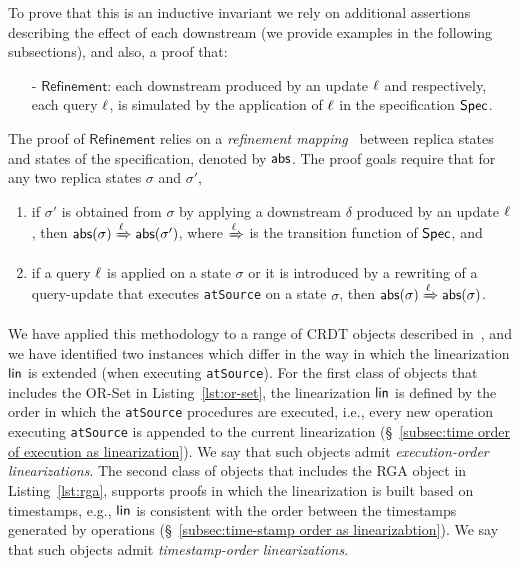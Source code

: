 To prove that this is an inductive invariant we rely on additional
assertions describing the effect of each downstream (we provide
examples in the following subsections), and also, a proof that:
\begin{itemize}
\item[-] $\mathsf{Refinement}$: each downstream produced by an update $\ell$ and respectively, each query $\ell$, is simulated by the application of $\ell$ in the specification $\mathsf{Spec}$.
\end{itemize}
The proof of $\mathsf{Refinement}$ relies on a \emph{refinement
  mapping}~\cite{earlierLamport,AbadiL91} between replica states and states of the
specification, denoted by $\mathsf{abs}$. The proof goals require that for
any two replica states $\sigma$ and $\sigma'$,
\begin{enumerate}
        \item if $\sigma'$ is obtained from $\sigma$ by applying a
          downstream $\delta$ produced by an update $\ell$, then
          \mbox{$\mathsf{abs}(\sigma)\xRightarrow{\ensuremath{\ell}}\mathsf{abs}(\sigma')$},
          where $\xRightarrow{\ensuremath{\ell}}$ is the transition function of
          $\mathsf{Spec}$, and
        \item if a query $\ell$ is applied on a state $\sigma$ or
          it is introduced by a rewriting of a query-update that
          executes \lstinline|atSource| on a state $\sigma$, then
          $\mathsf{abs}(\sigma)\xRightarrow{\ensuremath{\ell}}\mathsf{abs}(\sigma)$.
\end{enumerate}

We have applied this methodology to a range of CRDT objects described in~\cite{ShapiroPBZ11}, and we have identified two instances which differ in the way in which the linearization $\mathsf{lin}$ is extended (when executing \lstinline|atSource|). For the first class of objects that includes the OR-Set in Listing~\ref{lst:or-set}, the linearization $\mathsf{lin}$ is defined by the order in which the \lstinline|atSource| procedures are executed, i.e., every new operation executing \lstinline|atSource| is appended to the current linearization (\S~\ref{subsec:time order of execution as linearization}). We say that such objects admit \emph{execution-order linearizations}.
The second class of objects that includes the RGA object in Listing~\ref{lst:rga}, supports \CRDTLinshort{} proofs in which the linearization is built based on timestamps, e.g., $\mathsf{lin}$ is consistent with the order between the timestamps generated by operations (\S~\ref{subsec:time-stamp order as linearizabtion}). We say that such objects admit \emph{timestamp-order linearizations}.

